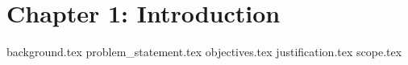 \section{Chapter 1: Introduction}
{background.tex}
{problem_statement.tex}
{objectives.tex}
{justification.tex}
{scope.tex}
\newpage
